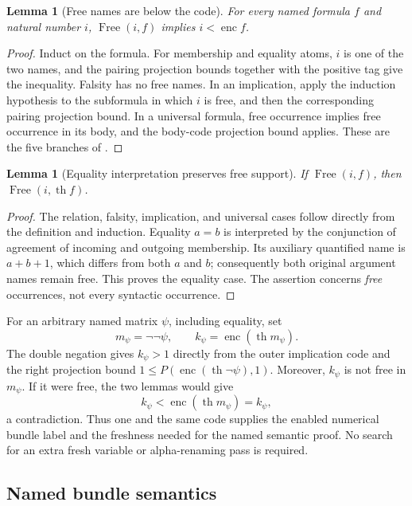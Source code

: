 \documentclass[11pt,letterpaper]{article}
\newtheorem{lemma}[theorem]{Lemma}
\theoremstyle{definition}
\theoremstyle{remark}
\newcommand{\enc}{\operatorname{enc}}
\newcommand{\thh}{\operatorname{th}}
\newcommand{\Free}{\operatorname{Free}}
\newcommand{\code}[1]{\texttt{\detokenize{#1}}}
\begin{document}
\begin{lemma}[Free names are below the code]\label{lem:free-code}
For every named formula \(f\) and natural number \(i\),
\(\Free(i,f)\) implies \(i<\enc f\).
\end{lemma}
\begin{proof}
Induct on the formula. For membership and equality atoms, \(i\) is one of the
two names, and the pairing projection bounds together with the positive tag give
the inequality. Falsity has no free names. In an implication, apply the induction
hypothesis to the subformula in which \(i\) is free, and then the corresponding
pairing projection bound. In a universal formula, free occurrence implies free
occurrence in its body, and the body-code projection bound applies.
These are the five branches of \code{free_lt_enc}.
\end{proof}

\begin{lemma}[Equality interpretation preserves free support]\label{lem:free-th}
If \(\Free(i,f)\), then \(\Free(i,\thh f)\).
\end{lemma}
\begin{proof}
The relation, falsity, implication, and universal cases follow directly from the
definition and induction. Equality \(a=b\) is interpreted by the conjunction of
agreement of incoming and outgoing membership. Its auxiliary quantified name is
\(a+b+1\), which differs from both \(a\) and \(b\); consequently both original
argument names remain free. This proves the equality case. The assertion concerns
\emph{free} occurrences, not every syntactic occurrence.
\end{proof}

For an arbitrary named matrix \(\psi\), including equality, set
\[
  m_\psi=\neg\neg\psi,\qquad
  k_\psi=\enc(\thh m_\psi).
\]
The double negation gives \(k_\psi>1\) directly from the outer implication code
and the right projection bound \(1\le P(\enc(\thh\neg\psi),1)\).
Moreover, \(k_\psi\) is not free in \(m_\psi\). If it were free, the two lemmas
would give
\[
  k_\psi<\enc(\thh m_\psi)=k_\psi,
\]
a contradiction. Thus one and the same code supplies the enabled numerical
bundle label and the freshness needed for the named semantic proof. No search for
an extra fresh variable or alpha-renaming pass is required.

\subsection{Named bundle semantics}
\end{document}
